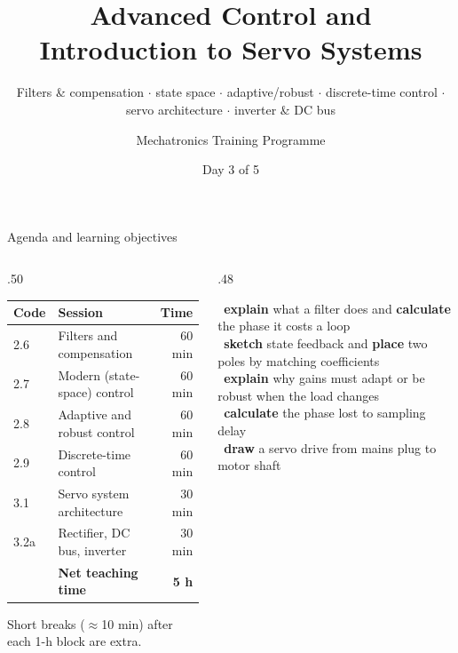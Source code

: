 \documentclass[aspectratio=169,10pt]{beamer}
\title[Advanced Control \& Intro to Servo Systems]{Advanced Control and Introduction to Servo Systems}
\subtitle{Filters \& compensation $\cdot$ state space $\cdot$ adaptive/robust $\cdot$ discrete-time control $\cdot$ servo architecture $\cdot$ inverter \& DC bus}
\author{Mechatronics Training Programme}
\institute{Theoretical Course Series}
\date{Day 3 of 5}
\begin{document}
\begin{frame}[plain]\titlepage\end{frame}

\begin{frame}{Agenda and learning objectives}
\begin{columns}[T]
\begin{column}{.50\textwidth}
\small
\begin{tabular}{@{}l l r@{}}
\toprule
\textbf{Code} & \textbf{Session} & \textbf{Time}\\
\midrule
2.6 & Filters and compensation & 60 min\\
2.7 & Modern (state-space) control & 60 min\\
2.8 & Adaptive and robust control & 60 min\\
2.9 & Discrete-time control & 60 min\\
3.1 & Servo system architecture & 30 min\\
3.2a & Rectifier, DC bus, inverter & 30 min\\
\midrule
 & \textbf{Net teaching time} & \textbf{5 h}\\
\bottomrule
\end{tabular}

\vspace{2mm}
{\scriptsize\color{mkGray}Short breaks ($\approx$10 min) after each 1-h block are extra.}
\end{column}
\begin{column}{.48\textwidth}
\begin{keybox}
\checkitem\ \textbf{explain} what a filter does and \textbf{calculate} the phase it costs a loop\\[.5mm]
\checkitem\ \textbf{sketch} state feedback and \textbf{place} two poles by matching coefficients\\[.5mm]
\checkitem\ \textbf{explain} why gains must adapt or be robust when the load changes\\[.5mm]
\checkitem\ \textbf{calculate} the phase lost to sampling delay\\[.5mm]
\checkitem\ \textbf{draw} a servo drive from mains plug to motor shaft
\end{keybox}
\end{column}
\end{columns}
\end{frame}
\end{document}
